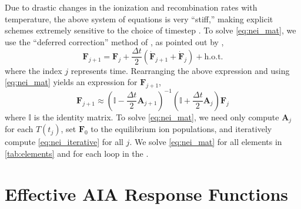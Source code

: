 Due to drastic changes in the ionization and recombination rates with temperature, the above system of equations is very ``stiff,'' making explicit schemes extremely sensitive to the choice of timestep \citep{macneice_numerical_1984,bradshaw_numerical_2009}. To solve \autoref{eq:nei_mat}, we use the ``deferred correction'' method of \citet{npl_modern_1961}, as pointed out by \citet{macneice_numerical_1984},
\begin{equation*}
    \mathbf{F}_{j+1} = \mathbf{F}_j + \frac{\Delta t}{2}(\dot{\mathbf{F}}_{j+1} + \dot{\mathbf{F}}_j) + \mathrm{h.o.t.}
\end{equation*}
where the index $j$ represents time. Rearranging the above expression and using \autoref{eq:nei_mat} yields an expression for $\mathbf{F}_{j+1}$,
\begin{equation}\label{eq:nei_iterative}
    \mathbf{F}_{j+1} \approx \left(\mathbb{I} - \frac{\Delta t}{2}\mathbf{A}_{j+1}\right)^{-1}\left(\mathbb{I} + \frac{\Delta t}{2}\mathbf{A}_{j}\right)\mathbf{F}_j
\end{equation}
where $\mathbb{I}$ is the identity matrix. To solve \autoref{eq:nei_mat}, we need only compute $\mathbf{A}_j$ for each $T(t_j)$, set $\mathbf{F}_0$ to the equilibrium ion populations, and iteratively compute \autoref{eq:nei_iterative} for all $j$. We solve \autoref{eq:nei_mat} for all elements in \autoref{tab:elements} and for each loop in the \AR{}.

\section{Effective AIA Response Functions}\label{effective_response_functions}

